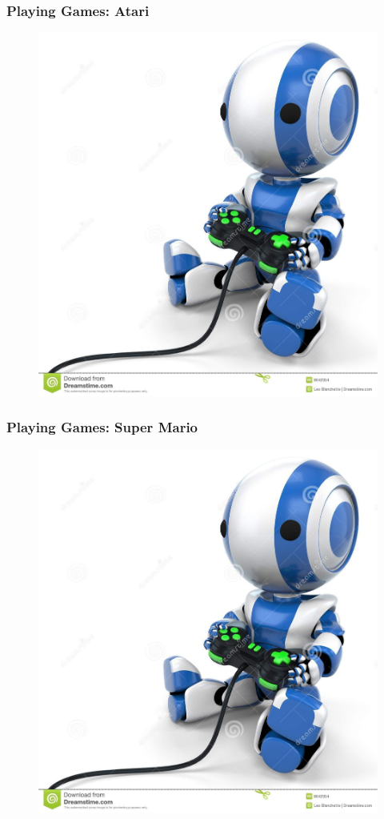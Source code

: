 \documentclass[handout]{beamer}
\begin{document}

\begin{frame}\frametitle{Playing Games: Atari}\small
\begin{figure}
\href{run:videos/intro/deep_mind.mp4}{
\includegraphics[width =0.6\linewidth,trim=0 69 0 0,clip]{Figures/robot_game.jpg}\\
{}
}
\end{figure}
\end{frame}

\begin{frame}\frametitle{Playing Games: Super Mario}\small
\begin{figure}
\href{run:videos/intro/super_mario.mp4}{
\includegraphics[width =0.6\linewidth,trim=0 69 0 0,clip]{Figures/robot_game.jpg}\\
{}
}
\end{figure}
\end{frame}
\end{document}
